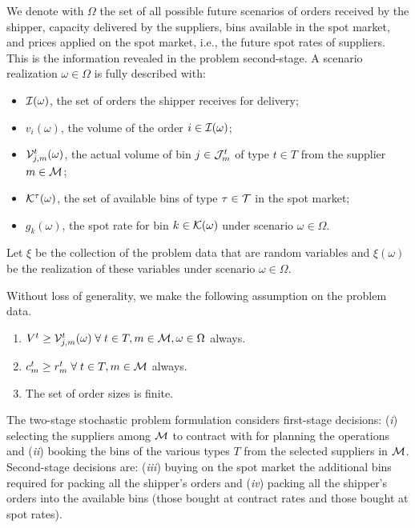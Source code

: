 \documentclass[a4paper,11pt]{article}
\begin{document}
	We denote with $\Omega$ the set of all possible future scenarios of orders received by the shipper, capacity delivered by the suppliers, bins available in the spot market, and prices applied on the spot market, i.e., the future spot rates of suppliers.
	This is the information revealed in the problem second-stage.
	A scenario realization $\omega \in \Omega$ is fully described with:
	\begin{itemize}
		\item ${\cal I}(\omega)$, the set of orders the shipper receives for delivery;
		\item $v_i(\omega)$, the volume of the order $i \in {\cal I}(\omega)$;
		\item ${\cal V}_{j,m}^t(\omega)$, the actual volume of bin $j \in {\cal J}^{t}_{m}$ of type $t \in T$ from the supplier $m \in \cal{M}$;
		\item ${\cal K}^{\tau}(\omega)$, the set of available bins of type $\tau \in \cal T$ in the spot market;
		\item $g_k(\omega)$, the spot rate for bin $ k \in {\cal K}(\omega)$ under scenario $\omega \in \Omega$.
	\end{itemize}
	Let $\xi$ be the collection of the problem data that are random variables and  $\xi(\omega)$ be the realization of these variables under scenario $\omega \in \Omega$.
	
	Without loss of generality, we make the following assumption on the problem data.
	\begin{enumerate}
		\item $V^{t} \ge {\cal V}_{j,m}^t(\omega) \; \forall \; t \in T, m \in {\cal M}, \omega \in \Omega $ always.
		\item $c_{m}^t \ge r_{m}^t \; \forall \; t \in T, m \in \cal{M}$ always.
		\item The set of order sizes is finite. %
	\end{enumerate}
	
	The two-stage stochastic problem formulation considers first-stage decisions:
	(\textit{i}) selecting the suppliers among $ {\cal M}$ to contract with for planning the operations and
	(\textit{ii}) booking the bins of the various types $ T$ from the selected suppliers in $ {\cal M}$.
	Second-stage decisions are:
	(\textit{iii}) buying on the spot market the additional bins required for packing all the shipper's orders and
	(\textit{iv}) packing all the shipper's orders into the available bins (those bought at contract rates and those bought at spot rates).
	
\end{document}
